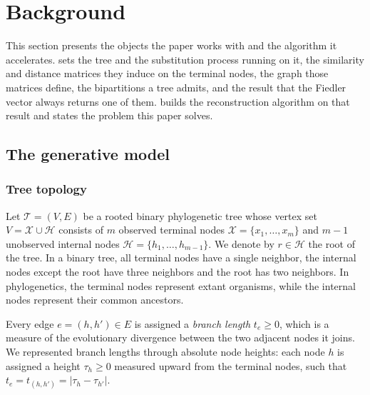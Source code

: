 \section{Background}\label{sec:background}

This section presents the objects the paper works with and the algorithm it accelerates.
 sets the tree and the substitution process running on it,
 the similarity and distance matrices they induce on the terminal nodes,
the graph those matrices define, the bipartitions a tree admits, and the result that the Fiedler
vector always returns one of them.
 builds the reconstruction algorithm on that result and states the problem this
paper solves.

\subsection{The generative model}\label{sec:bg-model}

\subsubsection*{Tree topology}

Let $\mathcal{T} = (V, E)$ be a rooted binary phylogenetic tree whose vertex set
$V = \mathcal{X} \cup \mathcal{H}$ consists of $m$ observed terminal nodes
$\mathcal{X} = \{x_1, \dots, x_m\}$ and $m-1$ unobserved internal nodes
$\mathcal{H} = \{h_1, \dots, h_{m-1}\}$.  We denote by 
$r \in \mathcal{H}$ the root of the tree. 
In a binary tree, all terminal nodes have a single neighbor,  the internal nodes except the root have three neighbors and the root has two neighbors. In phylogenetics, the terminal nodes represent extant organisms, while the internal nodes represent their common ancestors.

Every edge $e = (h, h') \in E$ is assigned a \emph{branch length} $t_e \ge 0$, which is a measure of the evolutionary divergence between the two adjacent nodes it joins. 
We represented branch lengths through
absolute node heights: each node $h$ is assigned a height $\tau_h \ge 0$ measured upward from the
terminal nodes, such that $t_e = t_{(h,h')} = |\tau_h - \tau_{h'}|$.


